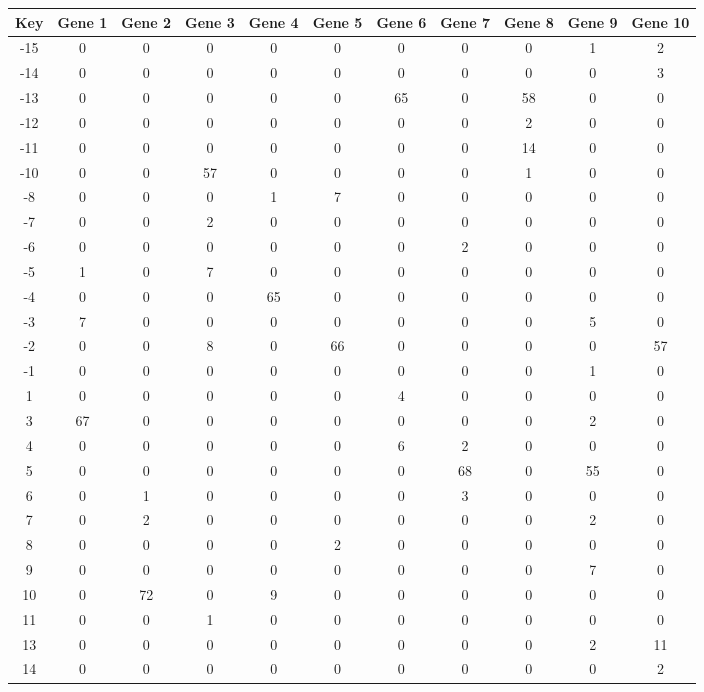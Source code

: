 \begin{tabular}{|c|c|c|c|c|c|c|c|c|c|c|}
\hline
Key & Gene 1 & Gene 2 & Gene 3 & Gene 4 & Gene 5 & Gene 6 & Gene 7 & Gene 8 & Gene 9 & Gene 10 \\
\hline
-15 & 0 & 0 & 0 & 0 & 0 & 0 & 0 & 0 & 1 & 2 \\
-14 & 0 & 0 & 0 & 0 & 0 & 0 & 0 & 0 & 0 & 3 \\
-13 & 0 & 0 & 0 & 0 & 0 & 65 & 0 & 58 & 0 & 0 \\
-12 & 0 & 0 & 0 & 0 & 0 & 0 & 0 & 2 & 0 & 0 \\
-11 & 0 & 0 & 0 & 0 & 0 & 0 & 0 & 14 & 0 & 0 \\
-10 & 0 & 0 & 57 & 0 & 0 & 0 & 0 & 1 & 0 & 0 \\
-8 & 0 & 0 & 0 & 1 & 7 & 0 & 0 & 0 & 0 & 0 \\
-7 & 0 & 0 & 2 & 0 & 0 & 0 & 0 & 0 & 0 & 0 \\
-6 & 0 & 0 & 0 & 0 & 0 & 0 & 2 & 0 & 0 & 0 \\
-5 & 1 & 0 & 7 & 0 & 0 & 0 & 0 & 0 & 0 & 0 \\
-4 & 0 & 0 & 0 & 65 & 0 & 0 & 0 & 0 & 0 & 0 \\
-3 & 7 & 0 & 0 & 0 & 0 & 0 & 0 & 0 & 5 & 0 \\
-2 & 0 & 0 & 8 & 0 & 66 & 0 & 0 & 0 & 0 & 57 \\
-1 & 0 & 0 & 0 & 0 & 0 & 0 & 0 & 0 & 1 & 0 \\
1 & 0 & 0 & 0 & 0 & 0 & 4 & 0 & 0 & 0 & 0 \\
3 & 67 & 0 & 0 & 0 & 0 & 0 & 0 & 0 & 2 & 0 \\
4 & 0 & 0 & 0 & 0 & 0 & 6 & 2 & 0 & 0 & 0 \\
5 & 0 & 0 & 0 & 0 & 0 & 0 & 68 & 0 & 55 & 0 \\
6 & 0 & 1 & 0 & 0 & 0 & 0 & 3 & 0 & 0 & 0 \\
7 & 0 & 2 & 0 & 0 & 0 & 0 & 0 & 0 & 2 & 0 \\
8 & 0 & 0 & 0 & 0 & 2 & 0 & 0 & 0 & 0 & 0 \\
9 & 0 & 0 & 0 & 0 & 0 & 0 & 0 & 0 & 7 & 0 \\
10 & 0 & 72 & 0 & 9 & 0 & 0 & 0 & 0 & 0 & 0 \\
11 & 0 & 0 & 1 & 0 & 0 & 0 & 0 & 0 & 0 & 0 \\
13 & 0 & 0 & 0 & 0 & 0 & 0 & 0 & 0 & 2 & 11 \\
14 & 0 & 0 & 0 & 0 & 0 & 0 & 0 & 0 & 0 & 2 \\
\hline
\end{tabular}